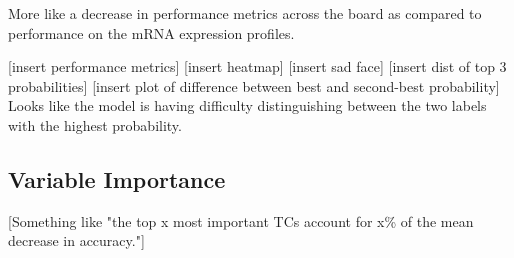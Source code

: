 More like a decrease in performance metrics across the board as compared to performance on the mRNA expression profiles.

[insert performance metrics]
[insert heatmap]
[insert sad face]
[insert dist of top 3 probabilities]
[insert plot of difference between best and second-best probability]
Looks like the model is having difficulty distinguishing between the two labels with the highest probability.

\subsection{Variable Importance}
[Something like "the top x most important TCs account for x\% of the mean decrease in accuracy."]
